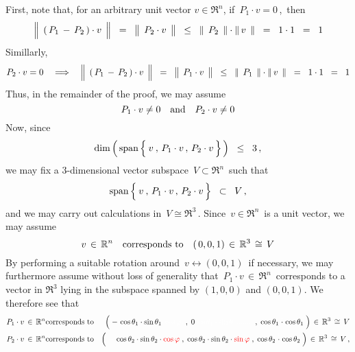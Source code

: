 First, note that, for an arbitrary unit vector $v \in \Re^{n}$,
if \,$P_{1} \cdot v = 0$\,,\, then
\begin{equation*}
\left\Vert\;\, (\,P_{1} \,\overset{{\color{white}.}}{-}\, P_{2}\,)\cdot v \,\;\right\Vert
\;\; = \;\;
	\left\Vert\;\, P_{2} \overset{{\color{white}.}}{\cdot} v \,\;\right\Vert
\;\; \leq \;\;
	\left\Vert\;\, P_{2} \,\;\right\Vert
	\cdot
	\left\Vert\, v \,\;\right\Vert
\;\; = \;\;
	1 \cdot 1
\;\; = \;\;
	1
\end{equation*}
Simillarly,
\begin{equation*}
P_{2} \cdot v = 0
\quad\Longrightarrow\quad
\left\Vert\;\, (\,P_{1} \,\overset{{\color{white}.}}{-}\, P_{2}\,)\cdot v \,\;\right\Vert
\;\; = \;\;
	\left\Vert\;\, P_{1} \overset{{\color{white}.}}{\cdot} v \,\;\right\Vert
\;\; \leq \;\;
	\left\Vert\;\, P_{1} \,\;\right\Vert
	\cdot
	\left\Vert\, v \,\;\right\Vert
\;\; = \;\;
	1 \cdot 1
\;\; = \;\;
	1
\end{equation*}
Thus, in the remainder of the proof, we may assume
\begin{equation*}
P_{1} \cdot v \neq 0
\quad\textnormal{and}\quad
P_{2} \cdot v \neq 0
\end{equation*}
Now, since
\begin{equation*}
\dim\left(\,\span\left\{\,\overset{{\color{white}-}}{v} \,,\, P_{1}\cdot v \,,\, P_{2}\cdot v\,\right\}\,\right)
\;\; \leq \;\;
	3\,,
\end{equation*}
we may fix a $3$-dimensional vector subspace \,$V \subset \Re^{n}$\, such that
\begin{equation*}
\span\left\{\,\overset{{\color{white}-}}{v} \,,\, P_{1}\cdot v \,,\, P_{2}\cdot v\,\right\}
\;\; \subset \;\;
	V\,,
\end{equation*}
and we may carry out calculations in \,$V \cong \Re^{3}$\,.
Since \,$v \in \Re^{n}$\, is a unit vector, we may assume
\begin{equation*}
v \,\in\, \Re^{n} \quad \textnormal{corresponds to} \quad (\,0,0,1) \,\in\, \Re^{3} \,\cong\, V
\end{equation*}
By performing a suitable rotation around \,$v \longleftrightarrow (0,0,1)$\, if necessary,
we may furthermore assume without loss of generality that
\,$P_{1} \cdot v \,\in\, \Re^{n}$\,
corresponds to a vector in $\Re^{3}$ lying in the subspace spanned by $(1,0,0)$ and $(0,0,1)$.
We therefore see that
\begin{eqnarray*}
P_{1}\cdot v \,\in\, \Re^{n}
& \textnormal{corresponds to} &
	\left(\;
		-\,\cos\theta_{1}\cdot\sin\theta_{1}{\color{white}\cdot\cos\varphi.}
		\; , \;
		0{\color{white}\cos\theta_{1}\cdot\sin\theta_{1}........}
		\; , \;
		\cos\theta_{1}\overset{{\color{white}1}}{\cdot}\cos\theta_{1}
		\;\right)
	\,\in\, \Re^{3} \,\cong\, V
\\
P_{2}\cdot v \,\in\, \Re^{n}
& \textnormal{corresponds to} &
	\left(\;
		{\color{white}-}\,\cos\theta_{2}\cdot\sin\theta_{2}\cdot{\color{red}\cos\varphi}
		\; , \;
		\cos\theta_{2}\cdot\sin\theta_{2}\cdot{\color{red}\sin\varphi}
		\; , \;
		\cos\theta_{2}\overset{{\color{white}1}}{\cdot}\cos\theta_{2}
		\;\right)
	\,\in\, \Re^{3} \,\cong\, V\,,
\end{eqnarray*}
